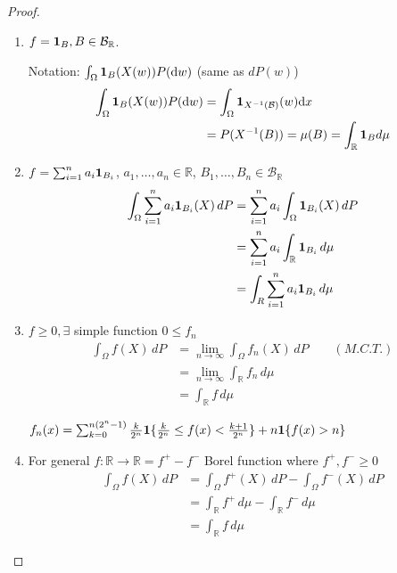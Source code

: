 \documentclass[11pt]{article}
\begin{document}
\begin{proof}
    \,

    \begin{enumerate}
        \item $f = \bm{1}_{B}, B \in \mathcal{B}_{\mathbb{R}}$.
        \begin{remark}
            Notation: $\int_{\Omega} \bm{1}_{B}(X(w))  P(\mathrm{d}w)$ (same as $dP(w)$)
            \begin{align*}
                \int_{\Omega} \bm{1}_{B}(X(w))  P(\mathrm{d}w) &= \int_{\Omega}\bm{1}_{X^{-1}(\mathcal{B})}(w)\mathrm{d}x\\
                &= P(X^{-1}(B)) = \mu(B) = \int_{\mathbb{R}} \bm{1}_{B} d \mu
            \end{align*}
        \end{remark}
        \item $f = \sum_{i=1}^{n} a_{i} \bm{1}_{B_{i}}$, $a_1, \ldots ,a_n \in \mathbb{R}$, $B_1, \ldots ,B_n \in \mathcal{B}_{\mathbb{R}}$
        \begin{align*}
            \int_{\Omega} \sum_{i=1}^{n}a_{i}\bm{1}_{B_i}(X) \, dP 
            &= \sum_{i=1}^{n}a_{i}  \int_{\Omega} \bm{1}_{B_i}(X) \, dP\\
            &= \sum_{i=1}^{n}a_i \int_{\mathbb{R}} \bm{1}_{B_i}\, d \mu \\
            &= \int_{R} \sum_{i=1}^{n}a_i \bm{1}_{B_i} \, d \mu
        \end{align*}
        \item $f \ge 0, \exists $ simple function $0 \le f_n $
        \begin{align*}
            \int _{\Omega} f(X) \, dP &= \lim_{n \to \infty} \int_{\Omega} f_n(X) \, dP \qquad (M.C.T.)\\
            &= \lim_{n \to \infty} \int_{\mathbb{R}} f_n \, d \mu \\
            &= \int_{\mathbb{R}} f \, d \mu
        \end{align*}
        \begin{remark}
            $f_n(x) = \sum_{k=0}^{n(2^n - 1)} \frac{k}{2^n} \bm{1} \{\frac{k}{2^n} \le f(x) < \frac{k+1}{2^n}\}
            + n \bm{1} \{ f(x) > n\}$
        \end{remark}
        \item For general $f: \mathbb{R} \to \mathbb{R} = f^{+} - f^{-}$ Borel function where $f^{+}, f^{-} \ge 0$
        \begin{align*}
            \int _{\Omega} f(X) \, dP &= \int _{\Omega} f^{+}(X) \, dP - \int _{\Omega} f^{-}(X) \, dP\\
            &= \int _{\mathbb{R}} f^{+} \, d \mu - \int _{\mathbb{R}} f^{-} \, d \mu \\
            &= \int_{\mathbb{R}} f \, d \mu
        \end{align*}
    \end{enumerate}
\end{proof}
\end{document}
